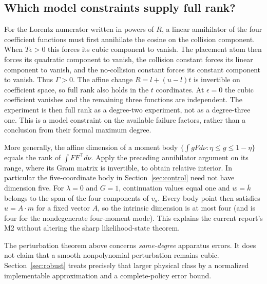 \subsection{Which model constraints supply full rank?}
For the Lorentz numerator written in powers of $R$, a linear annihilator
of the four coefficient functions must first annihilate the cosine on the
collision component. When $T\epsilon>0$ this forces its cubic component
to vanish. The placement atom then forces its quadratic component to
vanish, the collision constant forces its linear component to vanish,
and the no-collision constant forces its constant component to vanish.
Thus $\Gamma>0$. The affine change $R=l+(u-l)t$ is invertible on coefficient
space, so full rank also holds in the $t$ coordinates. At $\epsilon=0$
the cubic coefficient vanishes and the remaining three functions are
independent. The experiment is then full rank as a degree-two experiment,
not as a degree-three one. This is a model constraint on the available
failure factors, rather than a conclusion from their formal maximum degree.

More generally, the affine dimension of a moment body
$\{\int g Fd\nu:\eta\le g\le1-\eta\}$ equals the rank of
$\int FF^\top d\nu$. Apply the preceding annihilator argument on its range,
where its Gram matrix is invertible, to obtain relative interior. In
particular the five-coordinate body in Section~\ref{sec:control} need not
have dimension five. For $\lambda=0$ and $G=1$, continuation values equal
one and $w=\bar k$ belongs to the span of the four components of $v_a$.
Every body point then satisfies $u=A\cdot m$ for a fixed vector $A$,
so the intrinsic dimension is at most four (and is four for the
nondegenerate four-moment mode). This explains the current report's M2
without altering the sharp likelihood-state theorem.

The perturbation theorem above concerns \emph{same-degree} apparatus errors.
It does not claim that a smooth nonpolynomial perturbation remains cubic.
Section~\ref{sec:robust} treats precisely that larger physical class by a
normalized implementable approximation and a complete-policy error bound.
